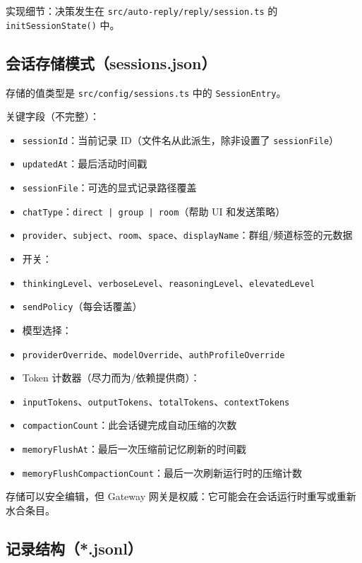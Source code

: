 实现细节：决策发生在 \texttt{src/auto-reply/reply/session.ts} 的 \texttt{initSessionState()} 中。

\hrulefill


\subsection{会话存储模式（sessions.json）}


存储的值类型是 \texttt{src/config/sessions.ts} 中的 \texttt{SessionEntry}。

关键字段（不完整）：

\begin{itemize}
  \item \texttt{sessionId}：当前记录 ID（文件名从此派生，除非设置了 \texttt{sessionFile}）
  \item \texttt{updatedAt}：最后活动时间戳
  \item \texttt{sessionFile}：可选的显式记录路径覆盖
  \item \texttt{chatType}：\texttt{direct | group | room}（帮助 UI 和发送策略）
  \item \texttt{provider}、\texttt{subject}、\texttt{room}、\texttt{space}、\texttt{displayName}：群组/频道标签的元数据
  \item 开关：
  \item \texttt{thinkingLevel}、\texttt{verboseLevel}、\texttt{reasoningLevel}、\texttt{elevatedLevel}
  \item \texttt{sendPolicy}（每会话覆盖）
  \item 模型选择：
  \item \texttt{providerOverride}、\texttt{modelOverride}、\texttt{authProfileOverride}
  \item Token 计数器（尽力而为/依赖提供商）：
  \item \texttt{inputTokens}、\texttt{outputTokens}、\texttt{totalTokens}、\texttt{contextTokens}
  \item \texttt{compactionCount}：此会话键完成自动压缩的次数
  \item \texttt{memoryFlushAt}：最后一次压缩前记忆刷新的时间戳
  \item \texttt{memoryFlushCompactionCount}：最后一次刷新运行时的压缩计数
\end{itemize}


存储可以安全编辑，但 Gateway 网关是权威：它可能会在会话运行时重写或重新水合条目。

\hrulefill


\subsection{记录结构（*.jsonl）}


